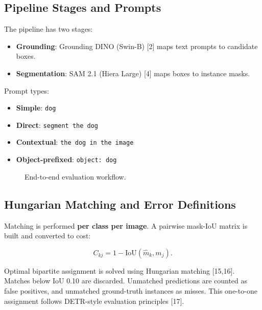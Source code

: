\documentclass[pdflatex,sn-mathphys-num]{sn-jnl}
\begin{document}
\subsection{Pipeline Stages and Prompts}

The pipeline has two stages:
\begin{itemize}
\item \textbf{Grounding}: Grounding DINO (Swin-B) [2] maps text prompts to candidate boxes.
\item \textbf{Segmentation}: SAM 2.1 (Hiera Large) [4] maps boxes to instance masks.
\end{itemize}

Prompt types:
\begin{itemize}
\item \textbf{Simple}: \texttt{dog}
\item \textbf{Direct}: \texttt{segment the dog}
\item \textbf{Contextual}: \texttt{the dog in the image}
\item \textbf{Object-prefixed}: \texttt{object: dog}
\end{itemize}

\begin{figure}[t]
\centering
{}
\caption{End-to-end evaluation workflow.}
\label{fig:pipeline-overview}
\end{figure}

\subsection{Hungarian Matching and Error Definitions}

Matching is performed \textbf{per class per image}. A pairwise mask-IoU matrix is built and converted to cost:

$$
C_{kj}=1-\text{IoU}(\hat{m}_k,m_j).
$$

Optimal bipartite assignment is solved using Hungarian matching [15,16]. Matches below IoU 0.10 are discarded. Unmatched predictions are counted as false positives, and unmatched ground-truth instances as misses. This one-to-one assignment follows DETR-style evaluation principles [17].
\end{document}
